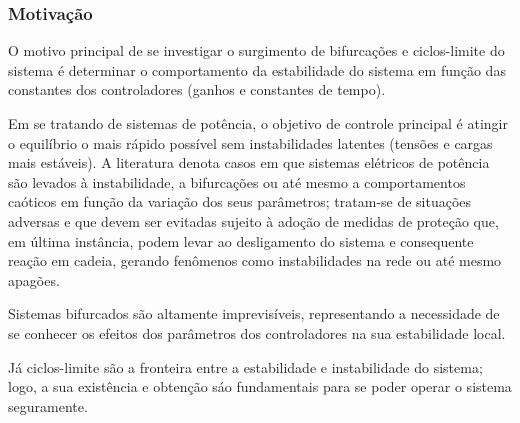 \documentclass[10pt, compress,xcolor={svgnames,dvipsnames,x11names}]{beamer}
\begin{document}
\begin{frame}%
\frametitle{Motivação}
\scriptsize

	O motivo principal de se investigar o surgimento de bifurcações e ciclos-limite do sistema é determinar o comportamento da estabilidade do sistema em função das constantes dos controladores (ganhos e constantes de tempo).

	Em se tratando de sistemas de potência, o objetivo de controle principal é atingir o equilíbrio o mais rápido possível sem instabilidades latentes (tensões e cargas mais estáveis). A literatura \cite{concordia, hassan, artigo2, artigo2, livroDoLFComOBretas} denota casos em que sistemas elétricos de potência são levados à instabilidade, a bifurcações ou até mesmo a comportamentos caóticos em função da variação dos seus parâmetros; tratam-se de situações adversas e que devem ser evitadas sujeito à adoção de medidas de proteção que, em última instância, podem levar ao desligamento do sistema e consequente reação em cadeia, gerando fenômenos como instabilidades na rede ou até mesmo apagões.

	Sistemas bifurcados são altamente imprevisíveis, representando a necessidade de se conhecer os efeitos dos parâmetros dos controladores na sua estabilidade local.

	Já ciclos-limite são a fronteira entre a estabilidade e instabilidade do sistema; logo, a sua existência e obtenção sáo fundamentais para se poder operar o sistema seguramente.

	

\normalsize
\end{frame}%
\end{document}
